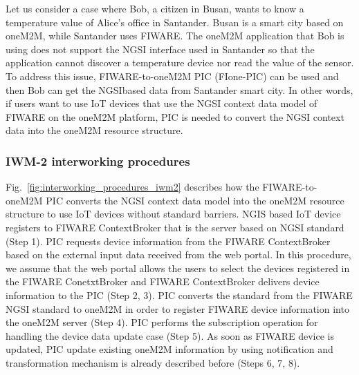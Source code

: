 Let us consider a case where Bob, a citizen in Busan, wants to know a temperature value of Alice’s office in Santander. Busan is a smart city based on oneM2M, while Santander uses FIWARE. The oneM2M application that Bob is using does not support the NGSI interface used in Santander so that the application cannot discover a temperature device nor read the value of the sensor. To address this issue, FIWARE-to-oneM2M PIC (FIone-PIC) can be used and then Bob can get the NGSIbased data from Santander smart city. In other words, if users want to use IoT devices that use the NGSI context data model of FIWARE on the oneM2M platform, PIC is needed to convert the NGSI context data into the oneM2M resource structure.

\subsubsection{IWM-2 interworking procedures}
Fig.~\ref{fig:interworking_procedures_iwm2} describes how the FIWARE-to-oneM2M PIC converts the NGSI context data model into the oneM2M resource structure to use IoT devices without standard barriers. NGIS based IoT device registers to FIWARE ContextBroker that is the server based on NGSI standard (Step 1). PIC requests device information from the FIWARE ContextBroker based on the external input data received from the web portal. In this procedure, we assume that the web portal allows the users to select the devices registered in the FIWARE ConetxtBroker and FIWARE ContextBroker delivers device information to the PIC (Step 2, 3). PIC converts the standard from the FIWARE NGSI standard to oneM2M in order to register FIWARE device information into the oneM2M server (Step 4). PIC performs the subscription operation for handling the device data update case (Step 5). As soon as FIWARE device is updated, PIC update existing oneM2M information by using notification and transformation mechanism is already described before (Steps 6, 7, 8).

